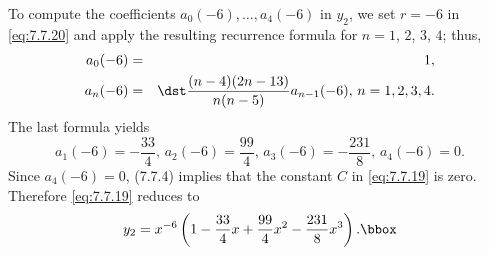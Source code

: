 \begin{examplesolution}
To compute the coefficients $a_{0}(-6),\dots,a_{4}(-6)$ in $y_{2}$, we set $r=-6$ in
\eqref{eq:7.7.20} and apply the resulting recurrence formula for $n=1$, $2$, $3$, $4$; thus,
\begin{eqnarray*}
  a_{0}(-6) & = & 1, \\
  a_{n}(-6) & = & \dst\frac{(n-4)(2n-13)}{n(n-5)}a_{n-1}(-6),\,n=1,2,3,4.
\end{eqnarray*}
The last formula yields
\[
  a_{1}(-6)=-\frac{33}{4},\,a_{2}(-6)=\frac{99}{4},\,a_{3}(-6)=-\frac{231}{8},\,a_{4}(-6)=0.
\]
Since $a_{4}(-6)=0$, \textup{(7.7.4)} implies that the constant $C$ in \eqref{eq:7.7.19} is zero.
Therefore \eqref{eq:7.7.19} reduces to
\[
  y_{2}=x^{-6}\left(1-\frac{33}{4}x+\frac{99}{4}x^{2}-\frac{231}{8}x^{3}\right).\bbox
\]
\end{examplesolution}

